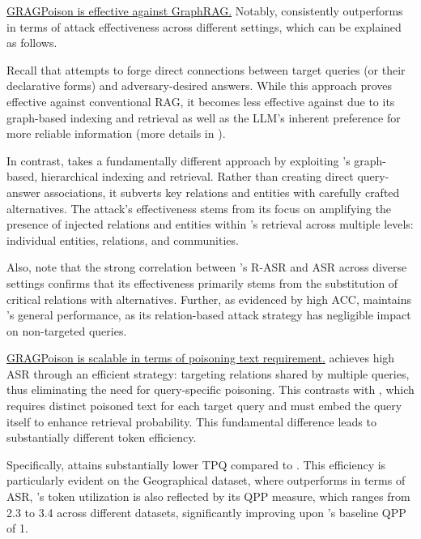 \vspace{2pt}
 \ul{GRAGPoison is effective against GraphRAG.} Notably, \attack consistently outperforms \prag in terms of attack effectiveness across different settings, which can be explained as follows. 

Recall that \prag attempts to forge direct connections between target queries (or their declarative forms) and adversary-desired answers. While this approach proves effective against conventional RAG, it becomes less effective against \rag due to its graph-based indexing and retrieval as well as the LLM's inherent preference for more reliable information (more details in ).

In contrast, \attack takes a fundamentally different approach by exploiting \rag's graph-based, hierarchical indexing and retrieval. Rather than creating direct query-answer associations, it subverts key relations and entities with carefully crafted alternatives. The attack's effectiveness stems from its focus on amplifying the presence of injected relations and entities within \rag's retrieval across multiple levels: individual entities, relations, and communities.

Also, note that the strong correlation between \attack's R-ASR and ASR across diverse settings confirms that its effectiveness primarily stems from the substitution of critical relations with alternatives. Further, as evidenced by high ACC, \attack maintains \rag's general performance, as its relation-based attack strategy has negligible impact on non-targeted queries.


\vspace{2pt}
 \ul{GRAGPoison is scalable in terms of poisoning text requirement.} \attack achieves high ASR through an efficient strategy: targeting relations shared by multiple queries, thus eliminating the need for query-specific poisoning. This contrasts with \prag, which requires distinct poisoned text for each target query and must embed the query itself to enhance retrieval probability. This fundamental difference leads to substantially different token efficiency. 


Specifically, \attack attains substantially lower TPQ compared to \prag. This efficiency is particularly evident on the Geographical dataset, where \attack outperforms \prag in terms of ASR,  \attack's token utilization is also reflected by its QPP measure, which ranges from 2.3 to 3.4 across different datasets, significantly improving upon \prag's baseline QPP of 1.

